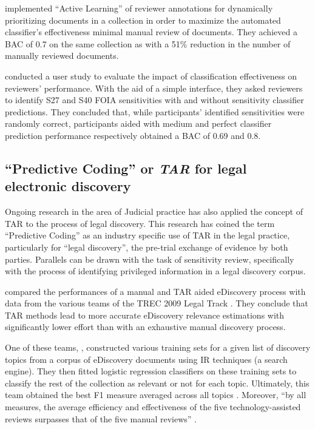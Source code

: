 \documentclass[\version]{l4proj}
\begin{document}
\textcite{mcdonaldActiveLearningStrategies2018} implemented ``Active Learning'' of reviewer annotations for dynamically prioritizing documents in a collection in order to maximize the automated classifier's effectiveness minimal manual review of documents.
They achieved a BAC of 0.7 on the same collection as \textcite{mcdonaldStudySVMKernel2017,mcdonaldEnhancingSensitivityClassification2017} with a 51\% reduction in the number of manually reviewed documents.

\textcite{mcdonaldHowSensitivityClassification2019} conducted a user study to evaluate the impact of classification effectiveness on reviewers' performance. With the aid of a simple interface, they asked reviewers to identify S27 and S40 FOIA sensitivities with and without sensitivity classifier predictions.
They concluded that, while participants' identified sensitivities were randomly correct, participants aided with medium and perfect classifier prediction performance respectively obtained a BAC of 0.69 and 0.8.

\subsection{``Predictive Coding'' or \textit{TAR} for legal electronic discovery}

Ongoing research in the area of Judicial practice has also applied the concept of TAR to the process of legal discovery.
This research has coined the term ``Predictive Coding'' \autocite{carrollGrossmancormackGlossaryTechnologyassisted2013} as an industry specific use of TAR in the legal practice, particularly for ``legal discovery'', the pre-trial exchange of evidence by both parties.
Parallels can be drawn with the task of sensitivity review, specifically with the process of identifying privileged information in a legal discovery corpus.

\textcite{grossmanTechnologyAssistedReviewEDiscovery2010} compared the performances of a manual and TAR aided eDiscovery process with data from the various teams of the TREC 2009 Legal Track \autocite{hedinOverviewTREC2009}.
They conclude that TAR methods lead to more accurate eDiscovery relevance estimations with significantly lower effort than with an exhaustive manual discovery process.

One of these teams, \textcite{cormackMachineLearningInformation2009}, constructed various training sets for a given list of discovery topics from a corpus of eDiscovery documents using IR techniques (a search engine).
They then fitted logistic regression classifiers on these training sets to classify the rest of the collection as relevant or not for each topic.
Ultimately, this team obtained the best F1 measure averaged across all topics \autocite{hedinOverviewTREC2009}.
Moreover, ``by all measures, the average efficiency and effectiveness of the five technology-assisted reviews surpasses that of the five manual reviews'' \autocite[p.~43]{grossmanTechnologyAssistedReviewEDiscovery2010}.
\end{document}
